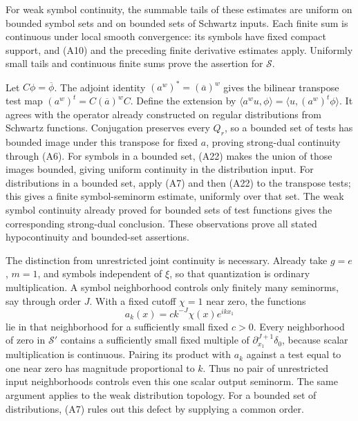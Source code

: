 \documentclass[
  11pt,
]{article}
\begin{document}
For weak symbol continuity, the summable tails of these estimates are
uniform on bounded symbol sets and on bounded sets of Schwartz inputs.
Each finite sum is continuous under local smooth convergence: its
symbols have fixed compact support, and (A10) and the preceding finite
derivative estimates apply. Uniformly small tails and continuous finite
sums prove the assertion for \(\mathcal S\).

Let \(C\phi=\overline\phi\). The adjoint identity
\((a^w)^*=(\overline a)^w\) gives the bilinear transpose test map
\((a^w)^t=C(\overline a)^wC\). Define the extension by
\(\langle a^wu,\phi\rangle=\langle u,(a^w)^t\phi\rangle\). It agrees
with the operator already constructed on regular distributions from
Schwartz functions. Conjugation preserves every \(Q_r\), so a bounded
set of tests has bounded image under this transpose for fixed \(a\),
proving strong-dual continuity through (A6). For symbols in a bounded
set, (A22) makes the union of those images bounded, giving uniform
continuity in the distribution input. For distributions in a bounded
set, apply (A7) and then (A22) to the transpose tests; this gives a
finite symbol-seminorm estimate, uniformly over that set. The weak
symbol continuity already proved for bounded sets of test functions
gives the corresponding strong-dual conclusion. These observations prove
all stated hypocontinuity and bounded-set assertions.

The distinction from unrestricted joint continuity is necessary. Already
take \(g=e\), \(m=1\), and symbols independent of \(\xi\), so that
quantization is ordinary multiplication. A symbol neighborhood controls
only finitely many seminorms, say through order \(J\). With a fixed
cutoff \(\chi=1\) near zero, the functions \[
a_k(x)=c k^{-J}\chi(x)e^{ikx_1}
\tag{A24}
\] lie in that neighborhood for a sufficiently small fixed \(c>0\).
Every neighborhood of zero in \(\mathcal S'\) contains a sufficiently
small fixed multiple of \(\partial_{x_1}^{J+1}\delta_0\), because scalar
multiplication is continuous. Pairing its product with \(a_k\) against a
test equal to one near zero has magnitude proportional to \(k\). Thus no
pair of unrestricted input neighborhoods controls even this one scalar
output seminorm. The same argument applies to the weak distribution
topology. For a bounded set of distributions, (A7) rules out this defect
by supplying a common order.
\end{document}
